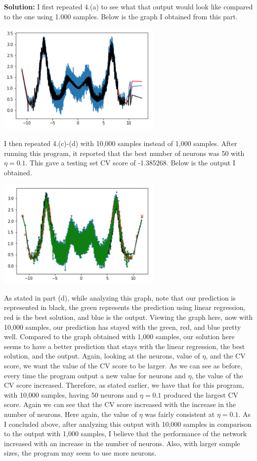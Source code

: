 \documentclass[a4paper]{article}
\begin{document}
\begin{itemize}
    \textbf{Solution:} I first repeated 4.(a) to see what that output would look like compared 
    to the one using 1.000 samples.  Below is the graph I obtained from this part.
    \begin{center}
        \includegraphics[width=0.6\textwidth]{4e-a10000.jpg}
    \end{center}
    I then repeated 4.(c)-(d) with 10,000 samples instead of 1,000 samples.  After running 
    this program, it reported that the best number of neurons was 50 with $\eta = 0.1$.  This 
    gave a testing set CV score of -1.385268.  Below is the output I obtained.
    \begin{center}
        \includegraphics[width=0.6\textwidth]{4e-c.jpg}
    \end{center}
    As stated in part (d), while analyzing this graph, note that our prediction is represented in 
    black, the green represents the prediction using linear regression, red is the best solution, 
    and blue is the output.  Viewing the graph here, now with 10,000 samples, our prediction has 
    stayed with the green, red, and blue pretty well.  Compared to the graph obtained with 1,000 
    samples, our solution here seems to have a better prediction that stays with the linear regression, 
    the best solution, and the output.  Again, looking at the neurons, value of $\eta$, and the CV score, 
    we want the value of the CV score to be larger.  As we can see as before, every time the program 
    output a new value for neurons and $\eta$, the value of the CV score increased.  Therefore, 
    as stated earlier, we have that for this program, with 10,000 samples, having 50 neurons and 
    $\eta = 0.1$ produced the largest CV score.  Again we can see that the CV score increased with 
    the increase in the number of neurons.  Here again, the value of $\eta$ was fairly consistent at 
    $\eta = 0.1$.  As I concluded above, after analyzing this output with 10,000 samples in comparison 
    to the output with 1,000 samples, I believe that the performance of the network increased with an 
    increase in the number of neurons.  Also, with larger sample sizes, the program may seem to use more 
    neurons.
\end{itemize}
\end{document}
